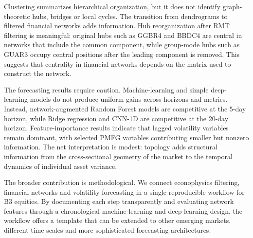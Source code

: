 Clustering summarizes hierarchical organization, but it does not identify graph-theoretic hubs, bridges or local cycles. The transition from dendrograms to filtered financial networks adds information. Hub reorganization after RMT filtering is meaningful: original hubs such as GGBR4 and BBDC4 are central in networks that include the common component, while group-mode hubs such as GUAR3 occupy central positions after the leading component is removed. This suggests that centrality in financial networks depends on the matrix used to construct the network.

The forecasting results require caution. Machine-learning and simple deep-learning models do not produce uniform gains across horizons and metrics. Instead, network-augmented Random Forest models are competitive at the 5-day horizon, while Ridge regression and CNN-1D are competitive at the 20-day horizon. Feature-importance results indicate that lagged volatility variables remain dominant, with selected PMFG variables contributing smaller but nonzero information. The net interpretation is modest: topology adds structural information from the cross-sectional geometry of the market to the temporal dynamics of individual asset variance.

The broader contribution is methodological. We connect econophysics filtering, financial networks and volatility forecasting in a single reproducible workflow for B3 equities. By documenting each step transparently and evaluating network features through a chronological machine-learning and deep-learning design, the workflow offers a template that can be extended to other emerging markets, different time scales and more sophisticated forecasting architectures.
